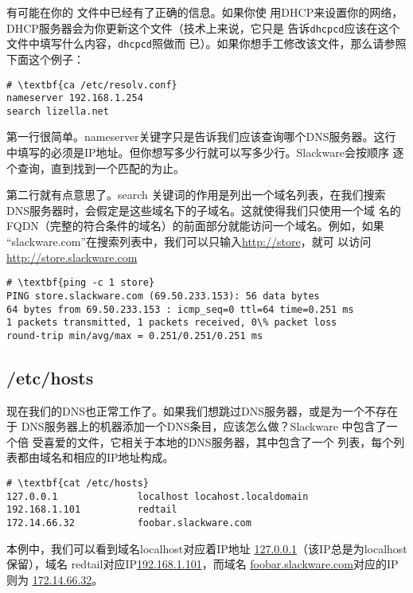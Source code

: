 有可能在你的 文件中已经有了正确的信息。如果你使
用DHCP来设置你的网络，DHCP服务器会为你更新这个文件（技术上来说，它只是
告诉\texttt{dhcpcd}应该在这个文件中填写什么内容，\texttt{dhcpcd}照做而
已）。如果你想手工修改该文件，那么请参照下面这个例子：

\begin{Verbatim}[frame=single,commandchars=\\\{\}]
# \textbf{ca /etc/resolv.conf}
nameserver 192.168.1.254
search lizella.net
\end{Verbatim}

第一行很简单。nameserver关键字只是告诉我们应该查询哪个DNS服务器。这行
中填写的必须是IP地址。但你想写多少行就可以写多少行。Slackware会按顺序
逐个查询，直到找到一个匹配的为止。

第二行就有点意思了。search 关键词的作用是列出一个域名列表，在我们搜索
DNS服务器时，会假定是这些域名下的子域名。这就使得我们只使用一个域
名的FQDN（完整的符合条件的域名）的前面部分就能访问一个域名。例如，如果
``slackware.com''在搜索列表中，我们可以只输入\url{http://store}，就可
以访问\url{http://store.slackware.com}
\begin{Verbatim}[frame=single,commandchars=\\\{\}]
# \textbf{ping -c 1 store}
PING store.slackware.com (69.50.233.153): 56 data bytes
64 bytes from 69.50.233.153 : icmp_seq=0 ttl=64 time=0.251 ms
1 packets transmitted, 1 packets received, 0\% packet loss
round-trip min/avg/max = 0.251/0.251/0.251 ms
\end{Verbatim}


\subsection{/etc/hosts}
\label{sec:networkConfiguration:tcpIP:hosts}
现在我们的DNS也正常工作了。如果我们想跳过DNS服务器，或是为一个不存在于
DNS服务器上的机器添加一个DNS条目，应该怎么做？Slackware 中包含了一个倍
受喜爱的文件，它相关于本地的DNS服务器，其中包含了一个
列表，每个列表都由域名和相应的IP地址构成。
\begin{Verbatim}[frame=single,commandchars=\\\{\}]
# \textbf{cat /etc/hosts}
127.0.0.1              localhost locahost.localdomain
192.168.1.101          redtail
172.14.66.32           foobar.slackware.com
\end{Verbatim}
本例中，我们可以看到域名localhost对应着IP地址
\href{http://127.0.0.1}{127.0.0.1}（该IP总是为localhost保留），域名
redtail对应IP\href{http://192.168.1.101}{192.168.1.101}，而域名
\href{http://foobar.slackware.com}{foobar.slackware.com}对应的IP则为
\href{http://172.14.66.32}{172.14.66.32}。

